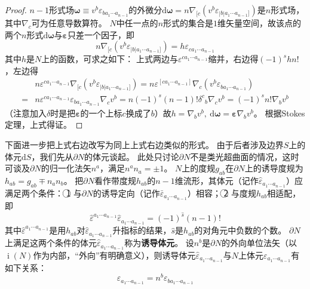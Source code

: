 \begin{proof}
    $n - 1$形式场$\bm\omega \equiv v^b\varepsilon_{b a_1 \cdots a_{n - 1}}$的外微分$\mathrm{d}\bm\omega = n\nabla_{[c}(v^b\varepsilon_{|b|a_1 \cdots a_{n - 1}]})$是$n$形式场，其中$\nabla_c$可为任意导数算符。
    $N$中任一点的$n$形式的集合是$1$维矢量空间，故该点的两个$n$形式$\mathrm{d}\bm\omega$与$\bm\varepsilon$只差一个因子，即
    $$n\nabla_{[c}(v^b\varepsilon_{|b|a_1 \cdots a_{n - 1}]}) = h\varepsilon_{ca_1 \cdots a_{n - 1}}$$
    其中$h$是$N$上的函数，可求之如下：
    上式两边与$\varepsilon^{ca_1 \cdots a_{n - 1}}$缩并，右边得$(-1)^shn!$，左边得
    \[\begin{split}
        & n\varepsilon^{ca_1 \cdots a_{n - 1}}\nabla_{[c}(v^b\varepsilon_{|b|a_1 \cdots a_{n - 1}]}) = n\varepsilon^{[ca_1 \cdots a_{n - 1}]}\nabla_{c}(v^b\varepsilon_{ba_1 \cdots a_{n - 1}}) \\
        = & n\varepsilon^{ca_1 \cdots a_{n - 1}}\varepsilon_{ba_1 \cdots a_{n - 1}}\nabla_{c}v^b = n(-1)^s(n - 1)!\delta^c{}_b\nabla_cv^b = (-1)^sn!\nabla_bv^b
    \end{split}\]
    （注意加入$\delta$时是把$\bm\varepsilon$的一个上标$c$换成了$b$）故$h = \nabla_bv^b, ~ \mathrm{d}\bm\omega = \bm\varepsilon\nabla_bv^b$。
    根据Stokes定理，上式得证。
\end{proof}

下面进一步把上式右边改写为同上上式右边类似的形式。
由于后者涉及边界$S$上的体元$\mathrm{d}S$，我们先从$\partial N$的体元谈起。
此处只讨论$\partial N$不是类光超曲面的情况，这时可谈及$\partial N$的归一化法矢$n^a$，满足$n^an_a = \pm 1$。
$N$上的度规$g_{ab}$在$\partial N$上的诱导度规为$h_{ab} = g_{ab} \mp n_an_b$。
把$\partial N$看作带度规$h_{ab}$的$n - 1$维流形，其体元（记作$\hat\varepsilon_{a_1 \cdots a_{n - 1}}$）应满足两个条件：
\textcircled{1} 与$\partial N$的诱导定向（记作$\bar\varepsilon_{a_1 \cdots a_{n - 1}}$）相容；
\textcircled{2} 与度规$h_{ab}$相适配，即
$$\hat\varepsilon^{a_1 \cdots a_{n - 1}}\hat\varepsilon_{a_1 \cdots a_{n - 1}} = (-1)^{\hat s}(n - 1)!$$
其中$\hat\varepsilon^{a_1 \cdots a_{n - 1}}$是用$h_{ab}$对$\hat\varepsilon_{a_1 \cdots a_{n - 1}}$升指标的结果，$\hat s$是$h_{ab}$的对角元中负数的个数。
$\partial N$上满足这两个条件的体元$\hat\varepsilon_{a_1 \cdots a_{n - 1}}$称为\textbf{诱导体元}。
设$n^b$是$\partial N$的外向单位法矢（以$\operatorname{i}(N)$作为内部，``外向''有明确意义），则诱导体元$\hat\varepsilon_{a_1 \cdots a_{n - 1}}$与$N$上体元$\varepsilon_{a_1 \cdots a_{n - 1}}$有如下关系：
$$\hat\varepsilon_{a_1 \cdots a_{n - 1}} = n^b\varepsilon_{b a_1 \cdots a_{n - 1}}$$

